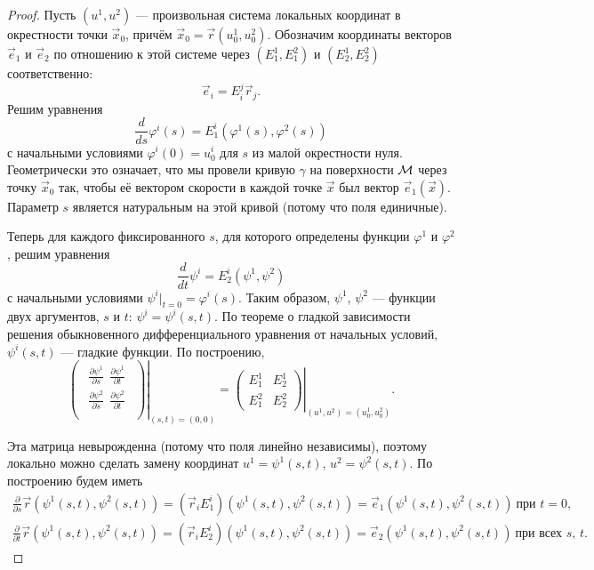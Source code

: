 \begin{proof}
	Пусть $(u^1, u^2)$ --- произвольная система локальных координат в окрестности точки $\vec{x}_0$, причём $\vec{x}_0 = \vec{r}(u_0^1, u_0^2)$. Обозначим координаты векторов $\vec{e}_1$ и $\vec{e}_2$ по отношению к этой системе через $(E_1^1, E_1^2)$ и $(E_2^1, E_2^2)$ соответственно:
	\[
		\vec{e}_i = E^j_i\vec{r}_j.
	\]
	Решим уравнения
	\[
		\frac{d}{ds}\varphi^i(s) = E^i_1(\varphi^1(s), \varphi^2(s))
	\]
	с начальными условиями $\varphi^i(0) = u^i_0$ для $s$ из малой окрестности нуля. Геометрически это означает, что мы провели кривую $\gamma$ на поверхности $\mathcal{M}$ через точку $\vec{x}_0$ так, чтобы её вектором скорости в каждой точке $\vec{x}$ был вектор $\vec{e}_1(\vec{x})$. Параметр $s$ является натуральным на этой кривой (потому что поля единичные).

	Теперь для каждого фиксированного $s$, для которого определены функции $\varphi^1$ и $\varphi^2$, решим уравнения
	\[
		\frac{d}{dt}\psi^i = E^i_2(\psi^1, \psi^2)
	\]
	с начальными условиями $\psi^i|_{t = 0} = \varphi^i(s)$. Таким образом, $\psi^1$, $\psi^2$ --- функции двух аргументов, $s$ и $t$: $\psi^i = \psi^i(s, t)$. По теореме о гладкой зависимости решения обыкновенного дифференциального уравнения от начальных условий, $\psi^i(s, t)$ --- гладкие функции. По построению,
	\[
		\left.
		\begin{pmatrix}
			\begin{aligned}
				\frac{\partial\psi^1}{\partial s} \ \ \frac{\partial\psi^1}{\partial t}\\
				\frac{\partial\psi^2}{\partial s} \ \ \frac{\partial\psi^2}{\partial t}\\
			\end{aligned}
		\end{pmatrix}
		\right|_{(s, t) = (0, 0)} =
		\left.
		\begin{pmatrix}
			E_1^1 & E_2^1\\
			E_1^2 & E_2^2
		\end{pmatrix}
		\right|_{(u^1, u^2) = (u^1_0, u^2_0)}.
	\]

	Эта матрица невырожденна (потому что поля линейно независимы), поэтому локально можно сделать замену координат $u^1 = \psi^1(s, t)$, $u^2 = \psi^2(s, t)$. По построению будем иметь
	\begin{gather*}
		\frac{\partial}{\partial s}\vec{r}(\psi^1(s, t), \psi^2(s, t)) = (\vec{r}_iE_1^i)(\psi^1(s, t), \psi^2(s, t)) = \vec{e}_1(\psi^1(s, t), \psi^2(s, t))\ \text{при $t = 0$},\\
		\frac{\partial}{\partial t}\vec{r}(\psi^1(s, t), \psi^2(s, t)) = (\vec{r}_iE_2^i)(\psi^1(s, t), \psi^2(s, t)) = \vec{e}_2(\psi^1(s, t), \psi^2(s, t))\ \text{при всех $s$, $t$}.
	\end{gather*}
\end{proof}

